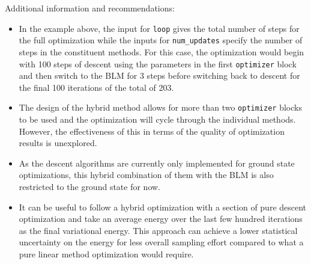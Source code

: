 Additional information and recommendations:
\begin{itemize}

    \item In the example above, the input for \texttt{loop} gives the total number of steps for the full optimization while the inputs for \texttt{num\_updates} specify
	the number of steps in the constituent methods. For this case, the optimization would begin with 100 steps of descent using the parameters in the first \texttt{optimizer} block
	and then switch to the BLM for 3 steps before switching back to descent for the final 100 iterations of the total of 203.
    \item The design of the hybrid method allows for more than two \texttt{optimizer} blocks to be used and the optimization will cycle through the individual methods. However, the effectiveness
	of this in terms of the quality of optimization results is unexplored.
    \item As the descent algorithms are currently only implemented for ground state optimizations, this hybrid combination of them with the BLM is also restricted to the ground state for now.
    \item It can be useful to follow a hybrid optimization with a section of pure descent optimization and take an average energy over the last few hundred iterations as the final variational energy.
	This approach can achieve a lower statistical uncertainty on the energy for less overall sampling effort compared to what a pure linear method optimization would require.
\end{itemize}

